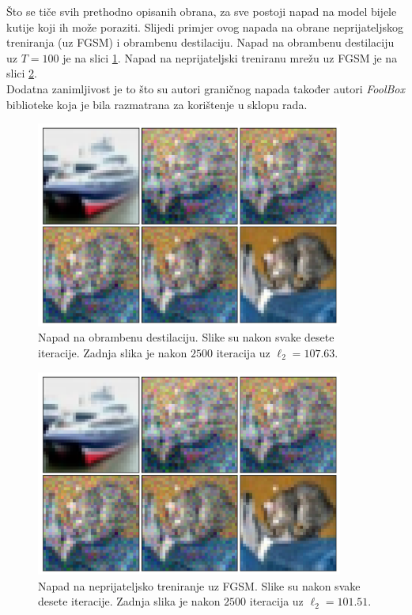 \documentclass[utf8, diplomski]{fer}
\begin{document}
Što se tiče svih prethodno opisanih obrana, za sve postoji napad na model bijele kutije koji ih može poraziti. Slijedi primjer ovog napada na obrane neprijateljskog treniranja (uz FGSM) i obrambenu destilaciju. Napad na obrambenu destilaciju uz $T = 100$ je na slici \ref{fig:boundary_distillation}. Napad na neprijateljski treniranu mrežu uz FGSM je na slici \ref{fig:boundary_fgsm_adv}. \\
Dodatna zanimljivost je to što su autori graničnog napada također autori \textit{FoolBox} biblioteke koja je bila razmatrana za korištenje u sklopu rada.

\begin{figure}[H]
\centering
\includegraphics[width=0.9\textwidth,keepaspectratio]{img/results/boundary_distillation.png}
\caption{Napad na obrambenu destilaciju. Slike su nakon svake desete iteracije. Zadnja slika je nakon $2500$ iteracija uz $\ell_{2} = 107.63$.}
\label{fig:boundary_distillation}
\end{figure}

\begin{figure}[H]
\centering
\includegraphics[width=0.9\textwidth,keepaspectratio]{img/results/boundary_distillation.png}
\caption{Napad na neprijateljsko treniranje uz FGSM. Slike su nakon svake desete iteracije. Zadnja slika je nakon $2500$ iteracija uz $\ell_{2} = 101.51$.}
\label{fig:boundary_fgsm_adv}
\end{figure}
\end{document}

